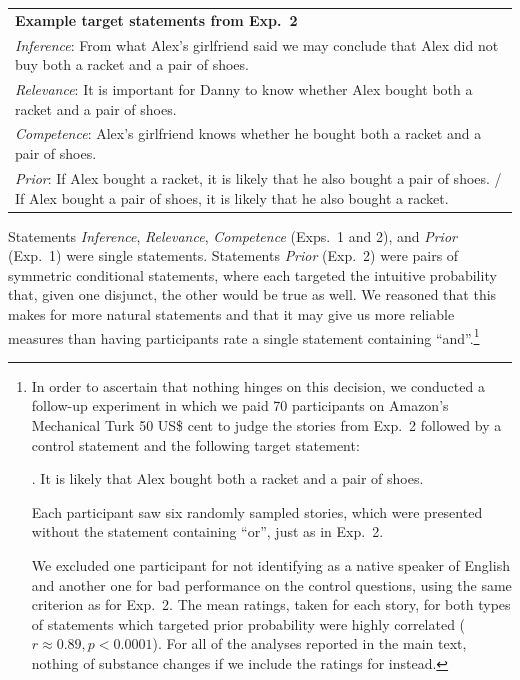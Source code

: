 \documentclass[12pt]{article}
\begin{document}
\begin{center}
\begin{tabular}{p{10cm}}
\textbf{Example target statements from Exp.\ 2}\\[0.2cm]
  \emph{Inference}: From what Alex's girlfriend said we may conclude that Alex did not buy both a racket and a
  pair of shoes.\\[.2cm]
  \emph{Relevance}: It is important for Danny to know whether Alex bought both a racket and a
  pair of shoes.\\[.2cm]
  \emph{Competence}: Alex's girlfriend knows whether he bought both a racket and a pair of shoes. \\[.2cm]
  \emph{Prior}: If Alex bought a racket, it is likely that he also bought a pair of shoes. / If Alex bought a pair of shoes, it is likely that he also bought a racket.
\end{tabular}
\end{center}

\noindent Statements \emph{Inference}, \emph{Relevance}, \emph{Competence} (Exps.\ 1 and 2), and \emph{Prior}  (Exp.\ 1) were single statements. Statements \emph{Prior} (Exp.\ 2) were pairs of symmetric conditional statements, where each targeted the intuitive probability that, given one disjunct, the other would be true as well. We reasoned that this makes for more natural statements and that it may give us more reliable measures than having participants rate a single statement containing ``and''.\footnote{In order to ascertain that nothing hinges on this decision, we conducted a follow-up experiment in which we paid 70 participants on Amazon's Mechanical Turk 50 US\$ cent to judge the stories from Exp.\ 2 followed by a control statement and the following target statement:

\ex.	It is likely that Alex bought both a racket and a pair of shoes.

Each participant saw six randomly sampled stories, which were presented without the statement containing ``or'', just as in Exp.\ 2.

We excluded one participant for not identifying as a native speaker of English and another one
for bad performance on the control questions, using the same criterion as for Exp.\ 2. The mean
ratings, taken for each story, for both types of statements which targeted prior probability
were highly correlated ($r \approx 0.89, p < 0.0001$). For all of the analyses reported in the
main text, nothing of substance changes if we include the ratings for \Last instead.}
\end{document}
